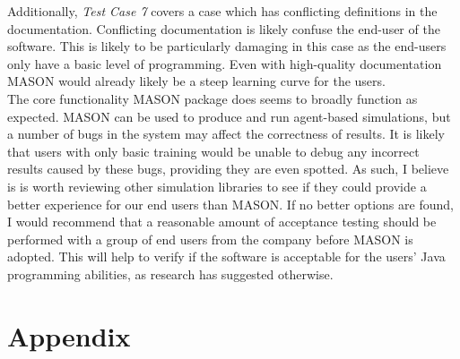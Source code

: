 \documentclass[11pt]{article}
\begin{document}
Additionally, \textit{Test Case 7} covers a case which has conflicting definitions in the documentation.
Conflicting documentation is likely confuse the end-user of the software.
This is likely to be particularly damaging in this case as the end-users only have a basic level of programming.
Even with high-quality documentation MASON would already likely be a steep learning curve for the users.
\\

The core functionality MASON package does seems to broadly function as expected.
MASON can be used to produce and run agent-based simulations, but a number of bugs in the system may affect the correctness of results.
It is likely that users with only basic training would be unable to debug any incorrect results caused by these bugs, providing they are even spotted.
As such, I believe is is worth reviewing other simulation libraries to see if they could provide a better experience for our end users than MASON.
If no better options are found, I would recommend that a reasonable amount of acceptance testing should be performed with a group of end users from the company before MASON is adopted.
This will help to verify if the software is acceptable for the users' Java programming abilities, as research\cite{mason_doc, abm_platforms_review} has suggested otherwise.

\newpage
\raggedright
{}

\newpage
\section{Appendix}

\end{document}
